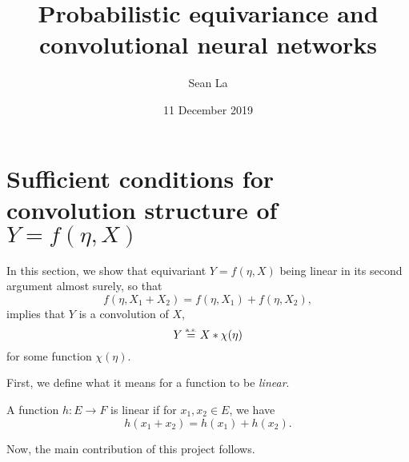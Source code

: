\documentclass[10pt]{article}
\title{Probabilistic equivariance and convolutional neural networks} %
\author{Sean La} %
\date{11 December 2019} %
\begin{document}
\maketitle



\section{Sufficient conditions for convolution structure of $Y = f(\eta,X)$}
In this section, we show that equivariant $Y = f(\eta,X)$ being linear in its second argument almost surely, so that
$$
	f(\eta, X_1 + X_2) = f(\eta,X_1) + f(\eta,X_2),
$$
implies that $Y$ is a convolution of $X$,
$$
	Y \stackrel{\text{\rm\tiny a.s.}}{=} X * \chi(\eta)
$$
for some function $\chi(\eta)$.

First, we define what it means for a function to be \textit{linear}.
\begin{definition} \label{def:linear}
	A function $h: E \to F$ is linear if for $x_1, x_2 \in E$, we have
	$$
		h(x_1 + x_2) = h(x_1) + h(x_2).
	$$ 
\end{definition}

\noindent

Now, the main contribution of this project follows.
\end{document}
